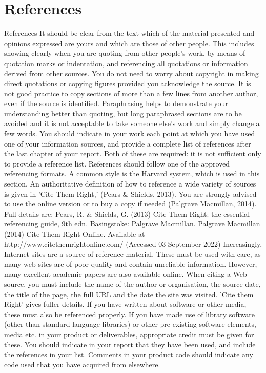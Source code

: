 \documentclass[11pt, twoside, a4paper]{report}
\newcommand{\todoinline}[1]{
    \begin{sloppypar}
        \colorlet{todo old}{.}
        \color{red}
        #1
        \color{todo old}
        \todo{See inline comment}
    \end{sloppypar}
}
\begin{document}
\chapter{References}
\todoinline{
    References
    It should be clear from the text which of the material presented and opinions expressed are yours and which are those of other people. This includes showing clearly when
    you are quoting from other people's work, by means of quotation marks or indentation, and referencing all quotations or information derived from other sources. You do not
    need to worry about copyright in making direct quotations or copying figures provided you acknowledge the source. It is not good practice to copy sections of more than a
    few lines from another author, even if the source is identified. Paraphrasing helps to demonstrate your understanding better than quoting, but long paraphrased sections
    are to be avoided and it is not acceptable to take someone else's work and simply change a few words.
    You should indicate in your work each point at which you have used one of your information sources, and provide a complete list of references after the last chapter of
    your report. Both of these are required: it is not sufficient only to provide a reference list. References should follow one of the approved referencing formats.
    A common style is the Harvard system, which is used in this section. An authoritative definition of how to reference a wide variety of sources is given in 'Cite Them Right,'
    (Pears \& Shields, 2013). You are strongly advised to use the online version or to buy a copy if needed (Palgrave Macmillan, 2014).
    Full details are:
    Pears, R. \& Shields, G. (2013) Cite Them Right: the essential referencing guide, 9th edn. Basingstoke: Palgrave Macmillan.
    Palgrave Macmillan (2014) Cite Them Right Online. Available at http://www.citethemrightonline.com/ (Accessed 03 September 2022)
    Increasingly, Internet sites are a source of reference material. These must be used with care, as many web sites are of poor quality and contain unreliable information.
    However, many excellent academic papers are also available online. When citing a Web source, you must include the name of the author or organisation, the source date,
    the title of the page, the full URL and the date the site was visited. 'Cite them Right' gives fuller details. If you have written about software or other media, these
    must also be referenced properly.
    If you have made use of library software (other than standard language libraries) or other pre-existing software elements, media etc. in your product or deliverables,
    appropriate credit must be given for these. You should indicate in your report that they have been used, and include the references in your list. Comments in your
    product code should indicate any code used that you have acquired from elsewhere.
}
\end{document}
